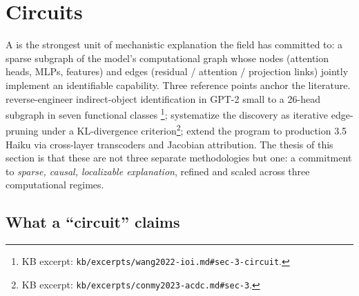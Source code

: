 
\section{Circuits}
\label{sec:circuits}

A \emph{} is the strongest unit of mechanistic explanation the
field has committed to: a sparse subgraph of the model's computational
graph whose nodes (attention heads, MLPs,  features) and edges
(residual / attention / projection links) jointly implement an
identifiable capability. Three reference points anchor the literature.
\citet{wang2022-ioi} reverse-engineer indirect-object identification in
GPT-2 small to a 26-head subgraph in seven functional classes
\citep[\S 3]{wang2022-ioi}\footnote{KB excerpt:
\nolinkurl{kb/excerpts/wang2022-ioi.md#sec-3-circuit}.};
\citet{conmy2023-acdc} systematize the discovery as iterative
edge-pruning under a KL-divergence criterion\footnote{KB excerpt:
\nolinkurl{kb/excerpts/conmy2023-acdc.md#sec-3}.};
\citet{lindsey2025-circuit-tracing} extend the program to production
 3.5 Haiku via cross-layer transcoders and Jacobian attribution.
The thesis of this section is that these are not three separate
methodologies but one: a commitment to \emph{sparse, causal, localizable
explanation}, refined and scaled across three computational regimes.

\subsection{What a ``circuit'' claims}
\label{sec:circuit-claim}

